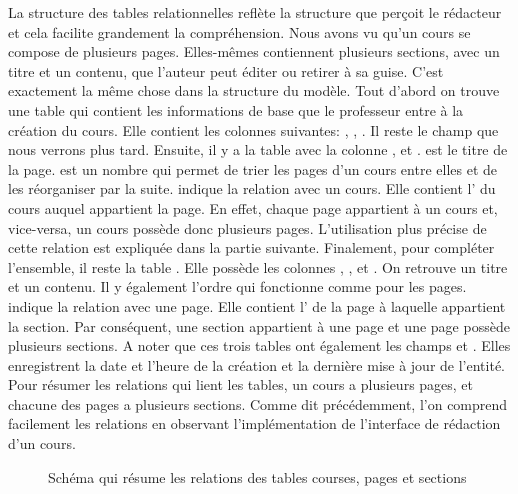\documentclass[a4paper,10pt,twoside]{sphinxmanual}
\begin{document}
La structure des tables relationnelles reflète la structure que perçoit le rédacteur et cela facilite grandement la compréhension. Nous avons vu qu'un cours se compose de plusieurs pages. Elles-mêmes contiennent plusieurs sections, avec un titre et un contenu, que l'auteur peut éditer ou retirer à sa guise. C'est exactement la même chose dans la structure du modèle. Tout d'abord on trouve une table  qui contient les informations de base que le professeur entre à la création du cours. Elle contient les colonnes suivantes: , , . Il reste le champ  que nous verrons plus tard. Ensuite, il y a la table  avec la colonne ,  et .  est le titre de la page.  est un nombre qui permet de trier les pages d'un cours entre elles et de les réorganiser par la suite.  indique la relation avec un cours. Elle contient l' du cours auquel appartient la page. En effet, chaque page appartient à un cours et, vice-versa, un cours possède donc plusieurs pages. L'utilisation plus précise de cette relation est expliquée dans la partie suivante. Finalement, pour compléter l'ensemble, il reste la table . Elle possède les colonnes , ,  et . On retrouve un titre et un contenu. Il y également l'ordre qui fonctionne comme pour les pages.  indique la relation avec une page. Elle contient l' de la page à laquelle appartient la section. Par conséquent, une section appartient à une page et une page possède plusieurs sections. A noter que ces trois tables ont également les champs  et . Elles enregistrent la date et l'heure de la création et la dernière mise à jour de l'entité. Pour résumer les relations qui lient les tables, un cours a plusieurs pages, et chacune des pages a plusieurs sections. Comme dit précédemment, l'on comprend facilement les relations en observant l'implémentation de l'interface de rédaction d'un cours.
\begin{figure}[htbp]
\centering
\capstart

\caption{Schéma qui résume les relations des tables courses, pages et sections}\end{figure}
\end{document}
